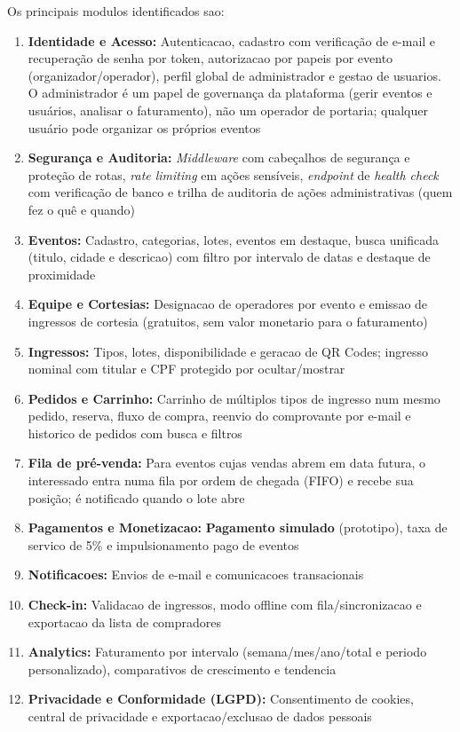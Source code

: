 Os principais modulos identificados sao:
\begin{enumerate}
    \item \textbf{Identidade e Acesso:} Autenticacao, cadastro com verificação de e-mail e recuperação de senha por token, autorizacao por papeis por evento (organizador/operador), perfil global de administrador e gestao de usuarios. O administrador é um papel de governança da plataforma (gerir eventos e usuários, analisar o faturamento), não um operador de portaria; qualquer usuário pode organizar os próprios eventos
    \item \textbf{Segurança e Auditoria:} \textit{Middleware} com cabeçalhos de segurança e proteção de rotas, \textit{rate limiting} em ações sensíveis, \textit{endpoint} de \textit{health check} com verificação de banco e trilha de auditoria de ações administrativas (quem fez o quê e quando)
    \item \textbf{Eventos:} Cadastro, categorias, lotes, eventos em destaque, busca unificada (titulo, cidade e descricao) com filtro por intervalo de datas e destaque de proximidade
    \item \textbf{Equipe e Cortesias:} Designacao de operadores por evento e emissao de ingressos de cortesia (gratuitos, sem valor monetario para o faturamento)
    \item \textbf{Ingressos:} Tipos, lotes, disponibilidade e geracao de QR Codes; ingresso nominal com titular e CPF protegido por ocultar/mostrar
    \item \textbf{Pedidos e Carrinho:} Carrinho de múltiplos tipos de ingresso num mesmo pedido, reserva, fluxo de compra, reenvio do comprovante por e-mail e historico de pedidos com busca e filtros
    \item \textbf{Fila de pré-venda:} Para eventos cujas vendas abrem em data futura, o interessado entra numa fila por ordem de chegada (FIFO) e recebe sua posição; é notificado quando o lote abre
    \item \textbf{Pagamentos e Monetizacao:} \textbf{Pagamento simulado} (prototipo), taxa de servico de 5\% e impulsionamento pago de eventos
    \item \textbf{Notificacoes:} Envios de e-mail e comunicacoes transacionais
    \item \textbf{Check-in:} Validacao de ingressos, modo offline com fila/sincronizacao e exportacao da lista de compradores
    \item \textbf{Analytics:} Faturamento por intervalo (semana/mes/ano/total e periodo personalizado), comparativos de crescimento e tendencia
    \item \textbf{Privacidade e Conformidade (LGPD):} Consentimento de cookies, central de privacidade e exportacao/exclusao de dados pessoais
\end{enumerate}

